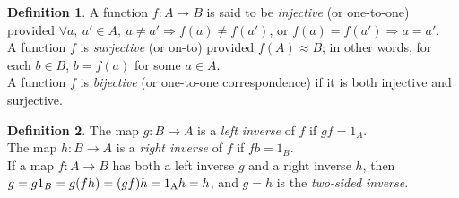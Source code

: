\documentclass[a4paper,sfsidenotes,openany]{tufte-book}
\theoremstyle{definition}
\newtheorem{definition}{Definition}[section]
\begin{document}
\begin{fullwidth}
\begin{definition}
A function $ f: A \rightarrow B$ is said to be \textit{{\color{blue} injective}} (or one-to-one) provided $ \forall a, \ a' \in A, \ a \neq a' \Rightarrow f(a) \neq f(a') $, or $ f(a) = f(a') \Rightarrow a = a'  $.\\
A function $ f $ is \textit{{\color{blue} surjective}} (or on-to) provided $ f(A) \approx B $; in other words, for each $ b \in B $, $ b=f(a) $ for some $ a \in A $.\\
A function $ f $ is \textit{{\color{blue} bijective}} (or one-to-one correspondence) if it is both injective and surjective.\\
\end{definition}
\>

\begin{definition}
The map $ g: B \rightarrow A $ is a \textit{{\color{blue} left inverse}} of $ f $ if $ gf = 1_A $.\\
The map $ h: B \rightarrow A $ is a \textit{{\color{blue} right inverse}} of $ f $ if $ fb = 1_B $.\\
If a map $ f: A \rightarrow B $ has both a left inverse $ g $ and a right inverse $ h $, then $ g = g1_B = g(fh) = (gf)h = 1 \textsubscript{A} h = h $, and $ g=h $ is the \textit{{\color{blue} two-sided inverse}}.\\
\end{definition}
\>

\end{fullwidth}


\newpage

\end{document}

